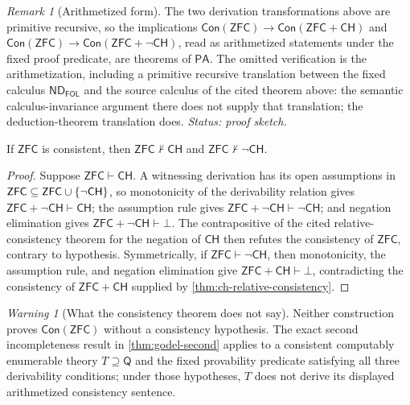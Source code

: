 \documentclass[11pt,oneside,openany]{book}
\theoremstyle{definition}
\theoremstyle{plain}
\newtheorem{theorem}[definition]{Theorem}
\theoremstyle{remark}
\newtheorem{remark}[definition]{Remark}
\newtheorem{warning}[definition]{Warning}
\let\LogicTheorem\theorem
\let\endLogicTheorem\endtheorem
\renewenvironment{theorem}[1][]{%
  \LogicTheorem[#1]%
  \if\relax\detokenize{#1}\relax\else\index{#1}\fi
}{\endLogicTheorem}
\DeclarePairedDelimiter{\set}{\lbrace}{\rbrace}
\newcommand{\derives}{\vdash}
\newcommand{\notderives}{\not\vdash}
\newcommand{\bottom}{\bot}
\newcommand{\ND}{\mathsf{ND}}
\newcommand{\PA}{\mathsf{PA}}
\newcommand{\ZFC}{\mathsf{ZFC}}
\newcommand{\FOL}{\mathsf{FOL}}
\begin{document}
\begin{remark}[Arithmetized form]
The two derivation transformations above are primitive recursive, so the
implications
\(\mathsf{Con}(\ZFC)\to\mathsf{Con}(\ZFC+\mathsf{CH})\) and
\(\mathsf{Con}(\ZFC)\to\mathsf{Con}(\ZFC+\neg\mathsf{CH})\), read as
arithmetized statements under the fixed proof predicate, are theorems of
\(\PA\).  The omitted verification is the arithmetization, including a
primitive recursive translation between the fixed calculus \(\ND_{\FOL}\)
and the source calculus of the cited theorem above: the semantic
calculus-invariance argument there does not supply that translation; the
deduction-theorem translation does.
\textit{Status: proof sketch.}
\end{remark}

\begin{theorem}[Nonderivability]
\label{thm:ch-nonderivability}
If \(\ZFC\) is consistent, then \(\ZFC\notderives\mathsf{CH}\) and
\(\ZFC\notderives\neg\mathsf{CH}\).
\end{theorem}

\begin{proof}
Suppose \(\ZFC\derives\mathsf{CH}\).  A witnessing derivation has its
open assumptions in \(\ZFC\subseteq\ZFC\cup\set{\neg\mathsf{CH}}\), so
monotonicity of the derivability relation gives
\(\ZFC+\neg\mathsf{CH}\derives\mathsf{CH}\); the assumption rule gives
\(\ZFC+\neg\mathsf{CH}\derives\neg\mathsf{CH}\); and negation elimination
gives \(\ZFC+\neg\mathsf{CH}\derives\bottom\).  The contrapositive of the
cited relative-consistency theorem for the negation of \(\mathsf{CH}\)
then refutes the consistency of \(\ZFC\), contrary to hypothesis.
Symmetrically, if \(\ZFC\derives\neg\mathsf{CH}\), then monotonicity, the
assumption rule, and negation elimination give
\(\ZFC+\mathsf{CH}\derives\bottom\), contradicting the consistency of
\(\ZFC+\mathsf{CH}\) supplied by \cref{thm:ch-relative-consistency}.
\end{proof}

\begin{warning}[What the consistency theorem does not say]
Neither construction proves \(\mathsf{Con}(\ZFC)\) without a consistency
hypothesis.  The exact second incompleteness result in
\cref{thm:godel-second} applies to a consistent computably enumerable theory
\(T\supseteq\mathsf Q\) and the fixed provability predicate satisfying all
three derivability conditions; under those hypotheses, \(T\) does not derive
its displayed arithmetized consistency sentence.
\end{warning}
\end{document}
